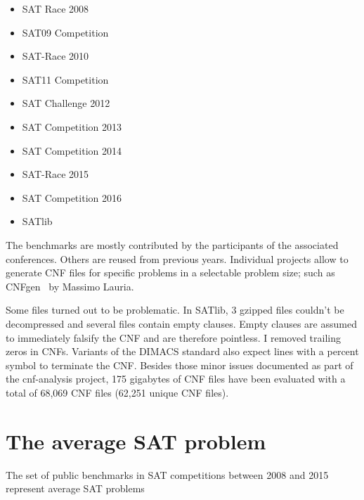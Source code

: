 \begin{center}
  \begin{minipage}{0.48\linewidth}
    \begin{itemize}
      \itemsep2pt
      \item SAT Race 2008
      \item SAT09 Competition
      \item SAT-Race 2010
      \item SAT11 Competition
      \item SAT Challenge 2012
    \end{itemize}
  \end{minipage}
  \begin{minipage}{0.48\linewidth}
    \begin{itemize}
      \itemsep2pt
      \item SAT Competition 2013
      \item SAT Competition 2014
      \item SAT-Race 2015
      \item SAT Competition 2016
      \item SATlib
    \end{itemize}
  \end{minipage}
\end{center}

The benchmarks are mostly contributed by the participants of the associated conferences.
Others are reused from previous years. Individual projects allow to generate CNF files
for specific problems in a selectable problem size; such as CNFgen~\cite{cnfgen} by
Massimo Lauria.

Some files turned out to be problematic. In SATlib, 3 gzipped files couldn't be decompressed and several files
contain empty clauses. Empty clauses are assumed to immediately falsify the CNF and are therefore pointless.
I removed trailing zeros in CNFs. Variants of the DIMACS standard also expect lines with a percent symbol to
terminate the CNF. Besides those minor issues documented as part of the cnf-analysis project,
175 gigabytes of CNF files have been evaluated with a total of 68,069 CNF files (62,251 unique CNF files).

\section{The average SAT problem}
\label{sec:features-average}
%
\begin{prop}
  The set of public benchmarks in SAT competitions between 2008 and 2015
  represent average SAT problems
\end{prop}

